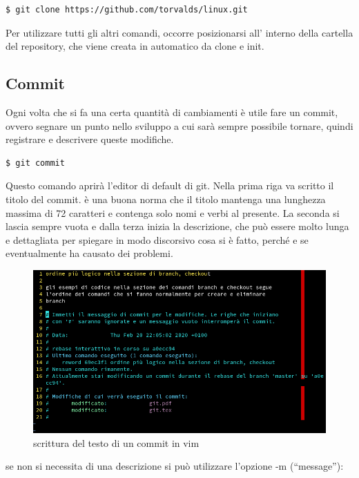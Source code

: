 \documentclass{article} \usepackage[textwidth=18cm,textheight=18cm]{geometry}
\begin{document}
\begin{verbatim}
$ git clone https://github.com/torvalds/linux.git
\end{verbatim}

Per utilizzare tutti gli altri comandi, occorre posizionarsi all' interno della
cartella del repository, che viene creata in automatico da clone e init.

\subsection{Commit}

Ogni volta che si fa una certa quantità di cambiamenti è utile fare un commit,
ovvero segnare un punto nello sviluppo a cui sarà sempre possibile tornare,
quindi registrare e descrivere queste modifiche. 

\begin{verbatim}
$ git commit
\end{verbatim}

Questo comando aprirà l'editor di default di git. Nella prima riga va scritto il
titolo del commit. è una buona norma che il titolo mantenga una lunghezza
massima di 72 caratteri e contenga solo nomi e verbi al presente. La seconda si
lascia sempre vuota e dalla terza inizia la descrizione, che può essere
molto lunga e dettagliata per spiegare in modo discorsivo cosa si è fatto, 
perché e se eventualmente ha causato dei problemi.

\begin{figure}
\includegraphics[width=6in]{vimEditCommit.png}
\centering
\caption{scrittura del testo di un commit in vim}
\end{figure}

se non si necessita di una descrizione si può utilizzare l'opzione -m
(``message''):
\end{document}
